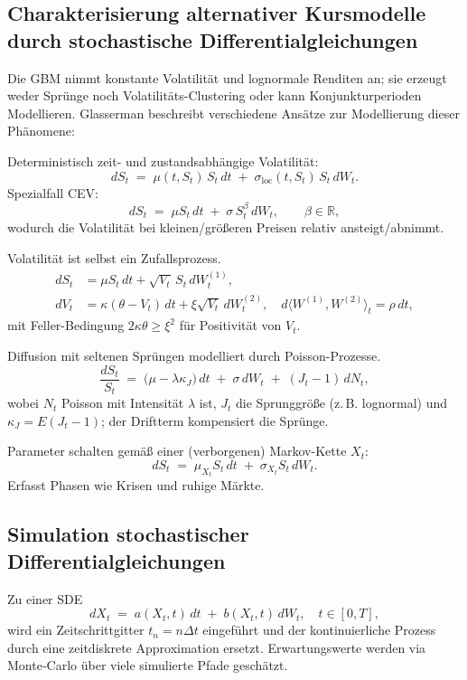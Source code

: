 \subsection{Charakterisierung alternativer Kursmodelle durch stochastische Differentialgleichungen}

Die GBM nimmt konstante Volatilität und lognormale Renditen an; sie erzeugt weder Sprünge noch Volatilitäts-Clustering oder kann Konjunkturperioden Modellieren.
Glasserman \cite{glasserman2003monte} beschreibt verschiedene Ansätze zur Modellierung dieser Phänomene:

\begin{bsp}
Deterministisch zeit- und zustandsabhängige Volatilität:
$$
dS_t \;=\; \mu(t,S_t)\,S_t\,dt \;+\; \sigma_{\mathrm{loc}}(t,S_t)\,S_t\,dW_t.
$$
Spezialfall CEV:
$$
dS_t \;=\; \mu S_t\,dt \;+\; \sigma\,S_t^{\beta}\,dW_t,\qquad \beta\in\mathbb R,
$$
wodurch die Volatilität bei kleinen/größeren Preisen relativ ansteigt/abnimmt.
\end{bsp}

\begin{bsp}
Volatilität ist selbst ein Zufallsprozess.
$$
\begin{aligned}
dS_t &= \mu S_t\,dt + \sqrt{V_t}\,S_t\,dW_t^{(1)},\\
dV_t &= \kappa(\theta - V_t)\,dt + \xi\sqrt{V_t}\,dW_t^{(2)},\quad d \langle W^{(1)},W^{(2)}\rangle_t=\rho\,dt,
\end{aligned}
$$
mit Feller-Bedingung $2\kappa\theta\ge \xi^2$ für Positivität von $V_t$.
\end{bsp}

\begin{bsp}
Diffusion mit seltenen Sprüngen modelliert durch Poisson-Prozesse.
$$
\frac{dS_t}{S_t} \;=\; \big(\mu - \lambda \kappa_J\big)\,dt \;+\; \sigma\,dW_t \;+\; (J_t-1)\,dN_t,
$$
wobei $N_t$ Poisson mit Intensität $\lambda$ ist, $J_t$ die Sprunggröße (z.\,B. lognormal) und $\kappa_J= E(J_t-1)$; der Driftterm kompensiert die Sprünge.
\end{bsp}

\begin{bsp}
Parameter schalten gemäß einer (verborgenen) Markov-Kette $X_t$:
$$
dS_t \;=\; \mu_{X_t} S_t\,dt \;+\; \sigma_{X_t} S_t\,dW_t.
$$
Erfasst Phasen wie Krisen und ruhige Märkte.
\end{bsp}

\subsection{Simulation stochastischer Differentialgleichungen}
Zu einer SDE
$$
dX_t \;=\; a(X_t,t)\,dt \;+\; b(X_t,t)\,dW_t,\quad t\in[0,T],
$$
wird ein Zeitschrittgitter $t_n=n\Delta t$ eingeführt und der kontinuierliche Prozess durch eine zeitdiskrete Approximation ersetzt. Erwartungswerte werden via Monte‑Carlo über viele simulierte Pfade geschätzt.


